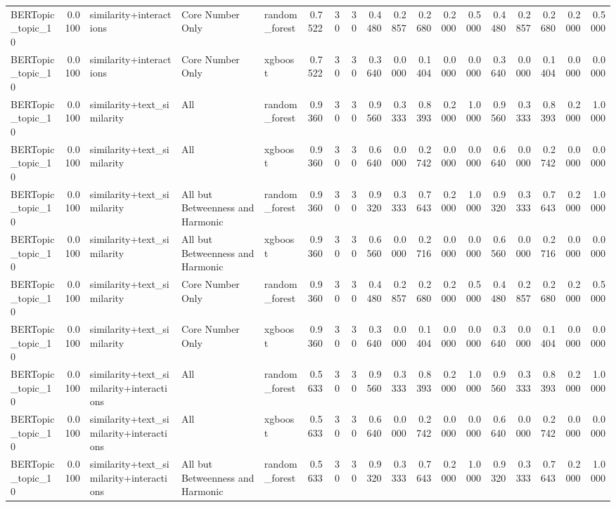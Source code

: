 \begin{tabular}{lrlllrrrrrrrrrrrrr}
BERTopic_topic_10 & 0.0100 & similarity+interactions & Core Number Only & random_forest & 0.7522 & 30 & 30 & 0.4480 & 0.2857 & 0.2680 & 0.2000 & 0.5000 & 0.4480 & 0.2857 & 0.2680 & 0.2000 & 0.5000 \\
BERTopic_topic_10 & 0.0100 & similarity+interactions & Core Number Only & xgboost & 0.7522 & 30 & 30 & 0.3640 & 0.0000 & 0.1404 & 0.0000 & 0.0000 & 0.3640 & 0.0000 & 0.1404 & 0.0000 & 0.0000 \\
BERTopic_topic_10 & 0.0100 & similarity+text_similarity & All & random_forest & 0.9360 & 30 & 30 & 0.9560 & 0.3333 & 0.8393 & 0.2000 & 1.0000 & 0.9560 & 0.3333 & 0.8393 & 0.2000 & 1.0000 \\
BERTopic_topic_10 & 0.0100 & similarity+text_similarity & All & xgboost & 0.9360 & 30 & 30 & 0.6640 & 0.0000 & 0.2742 & 0.0000 & 0.0000 & 0.6640 & 0.0000 & 0.2742 & 0.0000 & 0.0000 \\
BERTopic_topic_10 & 0.0100 & similarity+text_similarity & All but Betweenness and Harmonic & random_forest & 0.9360 & 30 & 30 & 0.9320 & 0.3333 & 0.7643 & 0.2000 & 1.0000 & 0.9320 & 0.3333 & 0.7643 & 0.2000 & 1.0000 \\
BERTopic_topic_10 & 0.0100 & similarity+text_similarity & All but Betweenness and Harmonic & xgboost & 0.9360 & 30 & 30 & 0.6560 & 0.0000 & 0.2716 & 0.0000 & 0.0000 & 0.6560 & 0.0000 & 0.2716 & 0.0000 & 0.0000 \\
BERTopic_topic_10 & 0.0100 & similarity+text_similarity & Core Number Only & random_forest & 0.9360 & 30 & 30 & 0.4480 & 0.2857 & 0.2680 & 0.2000 & 0.5000 & 0.4480 & 0.2857 & 0.2680 & 0.2000 & 0.5000 \\
BERTopic_topic_10 & 0.0100 & similarity+text_similarity & Core Number Only & xgboost & 0.9360 & 30 & 30 & 0.3640 & 0.0000 & 0.1404 & 0.0000 & 0.0000 & 0.3640 & 0.0000 & 0.1404 & 0.0000 & 0.0000 \\
BERTopic_topic_10 & 0.0100 & similarity+text_similarity+interactions & All & random_forest & 0.5633 & 30 & 30 & 0.9560 & 0.3333 & 0.8393 & 0.2000 & 1.0000 & 0.9560 & 0.3333 & 0.8393 & 0.2000 & 1.0000 \\
BERTopic_topic_10 & 0.0100 & similarity+text_similarity+interactions & All & xgboost & 0.5633 & 30 & 30 & 0.6640 & 0.0000 & 0.2742 & 0.0000 & 0.0000 & 0.6640 & 0.0000 & 0.2742 & 0.0000 & 0.0000 \\
BERTopic_topic_10 & 0.0100 & similarity+text_similarity+interactions & All but Betweenness and Harmonic & random_forest & 0.5633 & 30 & 30 & 0.9320 & 0.3333 & 0.7643 & 0.2000 & 1.0000 & 0.9320 & 0.3333 & 0.7643 & 0.2000 & 1.0000 \\

\end{tabular}
